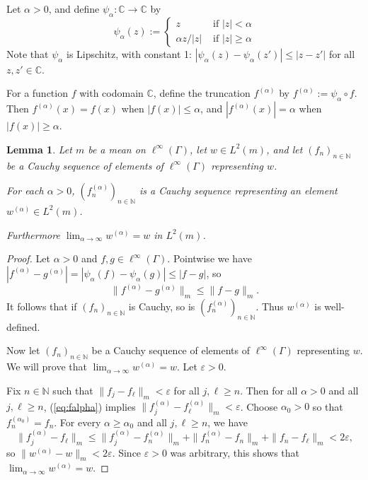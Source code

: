 \documentclass[12pt]{amsart} \usepackage{amsmath,centernot,amssymb,leftindex}
\newtheorem{lemma}[theorem]{Lemma}
\numberwithin{theorem}{section}
\numberwithin{equation}{section}
\theoremstyle{definition}
\begin{document}
Let $\alpha>0$, and define $\psi_{\alpha}:\mathbb C\to \mathbb C$ by
\[
\psi_{\alpha}(z) := \begin{cases}
	z &\text{ if } |z|<\alpha\\
	\alpha z/|z| &\text{ if } |z|\geq \alpha
\end{cases}
\]
Note that $\psi_{\alpha}$ is Lipschitz, with constant 1:  $|\psi_{\alpha}(z)-\psi_{\alpha}(z')|\leq |z-z'|$ for all $z, z'\in \mathbb C$.

For a function $f$ with codomain $\mathbb C$, define the truncation $f^{(\alpha)}$ by $f^{(\alpha)}:=\psi_{\alpha} \circ f$. 	Then $f^{(\alpha)}(x)=f(x)$ when $|f(x)|\leq \alpha$, and $|f^{(\alpha)}(x)|=\alpha$ when $|f(x)|\geq \alpha$.
	
\begin{lemma}\label{lem:Truncate}
	Let $m$ be a mean on $\ell^{\infty}(\Gamma)$,   let $w\in L^{2}(m)$, and let $(f_{n})_{n\in \mathbb N}$ be a Cauchy sequence of elements of $\ell^{\infty}(\Gamma)$ representing $w$.  
	
	For each $\alpha >0$, $(f_{n}^{(\alpha)})_{n\in \mathbb N}$ is a Cauchy sequence representing an element $w^{(\alpha)}\in L^{2}(m)$. 
	
	Furthermore $\lim_{\alpha\to\infty} w^{(\alpha)}=w$ in $L^{2}(m)$.
\end{lemma}
\begin{proof}
Let $\alpha>0$ and $f, g\in \ell^{\infty}(\Gamma)$.  Pointwise we have $|f^{(\alpha)}-g^{(\alpha)}|= |\psi_{\alpha}(f)-\psi_{\alpha}(g)|\leq |f-g|$, so 
\begin{equation}\label{eq:falpha}
	\|f^{(\alpha)} -g^{(\alpha)}\|_{m}\leq \|f-g\|_{m}.
\end{equation}  It follows that if $(f_{n})_{n\in \mathbb N}$ is Cauchy, so is $(f_{n}^{(\alpha)})_{n\in \mathbb N}$.  Thus $w^{(\alpha)}$ is well-defined.


Now let $(f_{n})_{n\in \mathbb N}$ be a Cauchy sequence of elements of $\ell^{\infty}(\Gamma)$ representing $w$.   We will prove that $\lim_{\alpha\to\infty}w^{(\alpha)}=w$.  Let $\varepsilon>0$.

Fix $n\in \mathbb N$ such that $\|f_{j}-f_{\ell}\|_{m}<\varepsilon$ for all $j,\ell \geq n$. Then for all $\alpha>0$ and all $j, \ell\geq n$, (\ref{eq:falpha}) implies $\|f_{j}^{(\alpha)}-f_{\ell}^{(\alpha)}\|_{m}<\varepsilon$. Choose $\alpha_{0}>0$ so that $f_{n}^{(\alpha_{0})}=f_{n}$. For every $\alpha\geq \alpha_{0}$ and all $j,\ell \geq n$, we have \[\|f_{j}^{(\alpha)}-f_{\ell}\|_{m}\leq \|f_{j}^{(\alpha)}-f_{n}^{(\alpha)}\|_{m}+\|f_{n}^{(\alpha)}-f_{n}\|_{m}+\|f_{n}-f_{\ell}\|_{m}<2\varepsilon,\]
so $\|w^{(\alpha)}-w\|_{m}<2\varepsilon$.  Since $\varepsilon>0$ was arbitrary, this shows that $\lim_{\alpha\to\infty} w^{(\alpha)}=w$. \end{proof}
\end{document}
